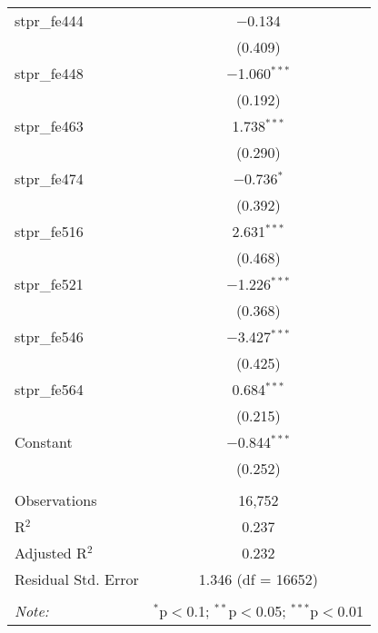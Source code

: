\begin{table}[!htbp]
\begin{tabular}{@{\extracolsep{5pt}}lc}
  stpr\_fe444 & $-$0.134 \\ 
  & (0.409) \\ 
  stpr\_fe448 & $-$1.060$^{***}$ \\ 
  & (0.192) \\ 
  stpr\_fe463 & 1.738$^{***}$ \\ 
  & (0.290) \\ 
  stpr\_fe474 & $-$0.736$^{*}$ \\ 
  & (0.392) \\ 
  stpr\_fe516 & 2.631$^{***}$ \\ 
  & (0.468) \\ 
  stpr\_fe521 & $-$1.226$^{***}$ \\ 
  & (0.368) \\ 
  stpr\_fe546 & $-$3.427$^{***}$ \\ 
  & (0.425) \\ 
  stpr\_fe564 & 0.684$^{***}$ \\ 
  & (0.215) \\ 
  Constant & $-$0.844$^{***}$ \\ 
  & (0.252) \\ 
 \hline \\[-1.8ex] 
Observations & 16,752 \\ 
R$^{2}$ & 0.237 \\ 
Adjusted R$^{2}$ & 0.232 \\ 
Residual Std. Error & 1.346 (df = 16652) \\ 
\hline 
\hline \\[-1.8ex] 
\textit{Note:}  & \multicolumn{1}{r}{$^{*}$p$<$0.1; $^{**}$p$<$0.05; $^{***}$p$<$0.01} \\ 
\end{tabular} 
\end{table} 
